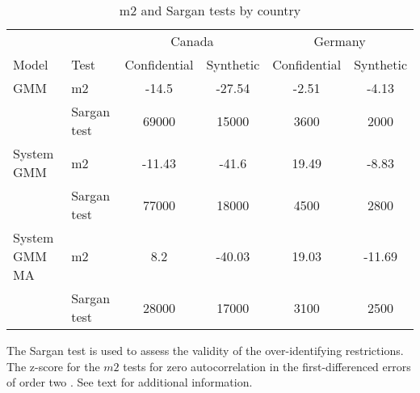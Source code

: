 
\begin{table}[!htbp] \centering 
  \caption{m2 and Sargan tests by country} 
  \label{tab:m2sargan} 
\begin{tabular}{@{\extracolsep{5pt}} llcccc} 
\\[-1.8ex]
\toprule
      &      &\multicolumn{2}{c}{Canada}&\multicolumn{2}{c}{Germany}\\
Model & Test & Confidential & Synthetic & Confidential & Synthetic \\ 
\toprule
GMM & m2 & -14.5 & -27.54 & -2.51 & -4.13 \\ 
    & Sargan test & 69000 & 15000 & 3600 & 2000 \\ 
    \midrule
System GMM & m2 & -11.43 & -41.6 & 19.49 & -8.83 \\ 
           & Sargan test & 77000 & 18000 & 4500 & 2800 \\ 
           \midrule
System GMM MA & m2 & 8.2 & -40.03 & 19.03 & -11.69 \\ 
              & Sargan test & 28000 & 17000 & 3100 & 2500 \\ 
\bottomrule
\end{tabular} 
\begin{tablenotes}\small \item 
The Sargan test \parencite{blundell_estimation_2001,RePEc:oup:restud:v:58:y:1991:i:2:p:277-297.} is used to assess the validity of the over-identifying restrictions. The z-score for the $m2$ tests for zero autocorrelation in the  first-differenced errors of order two \parencite{RePEc:oup:restud:v:58:y:1991:i:2:p:277-297.}. See text for additional information.
\end{tablenotes}
\end{table} 
